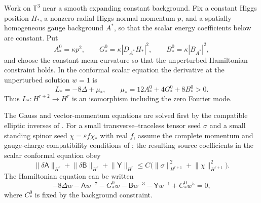 \documentclass[11pt]{article}
\numberwithin{equation}{section}
\theoremstyle{definition}
\theoremstyle{remark}
\newcommand{\norm}[1]{\lVert#1\rVert}
\begin{document}
Work on $\mathbb T^3$ near a smooth expanding constant background.  Fix a constant Higgs position $H_*$, a nonzero radial Higgs normal momentum $p$, and a spatially homogeneous gauge background $A^*$, so that the scalar energy coefficients below are constant.  Put
\begin{equation}
 A_*^0=\kappa p^2,
 \qquad G_*^0=\kappa|D_{A^*}H_*|^2,
 \qquad B_*^0=\kappa|B_{A^*}|^2,
 \label{eq:generated-background-coeffs}
\end{equation}
and choose the constant mean curvature so that the unperturbed Hamiltonian constraint holds.  In the conformal scalar equation the derivative at the unperturbed solution $w=1$ is
\begin{equation}
 L_*=-8\Delta+\mu_*,
 \qquad
 \mu_*=12A_*^0+4G_*^0+8B_*^0>0.
 \label{eq:generated-Lstar}
\end{equation}
Thus $L_*:H^{r+2}\to H^r$ is an isomorphism including the zero Fourier mode.

The Gauss and vector-momentum equations are solved first by the compatible elliptic inverses of .  For a small transverse--traceless tensor seed $\sigma$ and a small standing spinor seed $\chi=\varepsilon f\chi_*$ with real $f$, assume the complete momentum and gauge-charge compatibility conditions of ; the resulting source coefficients in the scalar conformal equation obey
\begin{equation}
 \norm{\delta\mathsf A}_{H^r}
 +\norm{\delta\mathsf B}_{H^r}
 +\norm{\mathsf Y}_{H^r}
 \le C\bigl(\norm\sigma_{H^{r+1}}^2+\norm\chi_{H^{r+1}}^2\bigr).
 \label{eq:generated-source-small}
\end{equation}
The Hamiltonian equation can be written
\begin{equation}
 -8\Delta w-\mathsf A w^{-7}-G_*^0w
 -\mathsf B w^{-3}-\mathsf Y w^{-1}+C_*^0w^5=0,
 \label{eq:generated-Hamiltonian}
\end{equation}
where $C_*^0$ is fixed by the background constraint.
\end{document}
